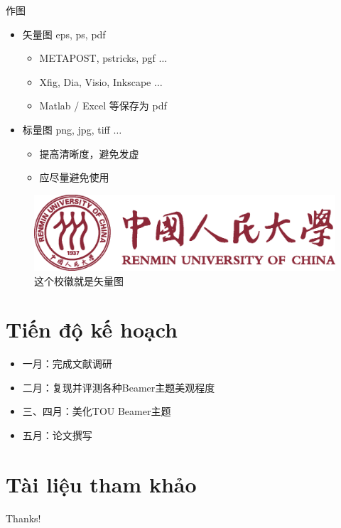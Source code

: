 \documentclass{beamer}
\begin{document}
\begin{frame}{作图}
    \begin{itemize}
        \item 矢量图 eps, ps, pdf
        \begin{itemize}
            \item METAPOST, pstricks, pgf $\ldots$
            \item Xfig, Dia, Visio, Inkscape $\ldots$
            \item Matlab / Excel 等保存为 pdf
        \end{itemize}
        \item 标量图 png, jpg, tiff $\ldots$
        \begin{itemize}
            \item 提高清晰度，避免发虚
            \item 应尽量避免使用
        \end{itemize}
    \end{itemize}
    \begin{figure}[htpb]
        \centering
        \includegraphics[width=0.2\linewidth]{pic/Renmin_Univ_Logo.eps}
        \caption{这个校徽就是矢量图}
    \end{figure}
\end{frame}

\section{Tiến độ kế hoạch}  %
\begin{frame}
    \begin{itemize}
        \item 一月：完成文献调研
        \item 二月：复现并评测各种Beamer主题美观程度
        \item 三、四月：美化TOU Beamer主题
        \item 五月：论文撰写
    \end{itemize}
\end{frame}

\section{Tài liệu tham khảo} %
\begin{frame}[allowframebreaks]
    
    
\end{frame}

\begin{frame}
    \begin{center}
        {\Huge\calligra Thanks!}
    \end{center}
\end{frame}
\end{document}
